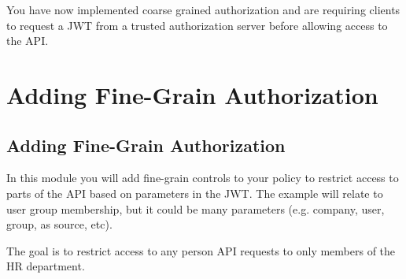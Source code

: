 \documentclass[letterpaper,10pt,english]{sphinxmanual}
\begin{document}
You have now implemented coarse grained authorization and are requiring
clients to request a JWT from a trusted authorization server before
allowing access to the API.


\section{Adding Fine-Grain Authorization}
\label{\detokenize{class1/module3/module3:adding-fine-grain-authorization}}\label{\detokenize{class1/module3/module3::doc}}

\subsection{Adding Fine-Grain Authorization}
\label{\detokenize{class1/module3/module3:id1}}
In this module you will add fine-grain controls to your policy to
restrict access to parts of the API based on parameters in the JWT. The
example will relate to user group membership, but it could be many
parameters (e.g. company, user, group, as source, etc).

The goal is to restrict access to any person API requests to only
members of the HR department.
\end{document}
